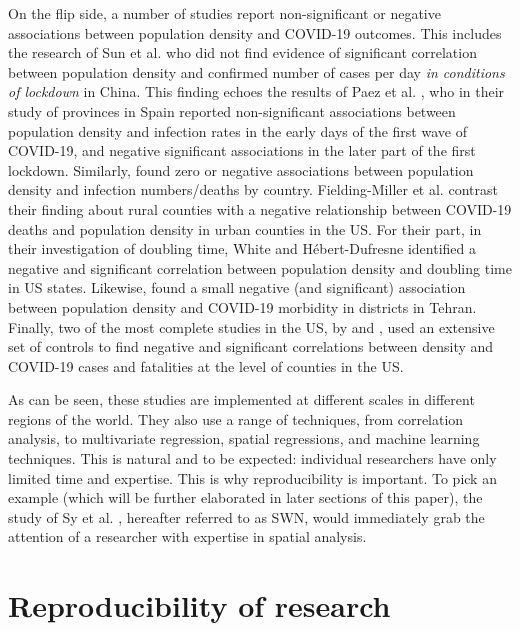 \documentclass[preprint, 3p,
authoryear]{elsarticle} %
\begin{document}
On the flip side, a number of studies report non-significant or negative
associations between population density and COVID-19 outcomes. This
includes the research of Sun et al. \citeyearpar{Sun2020impacts} who did
not find evidence of significant correlation between population density
and confirmed number of cases per day \emph{in conditions of lockdown}
in China. This finding echoes the results of Paez et al.
\citeyearpar{Paez2020spatio}, who in their study of provinces in Spain
reported non-significant associations between population density and
infection rates in the early days of the first wave of COVID-19, and
negative significant associations in the later part of the first
lockdown. Similarly, \citet{Skorka2020macroecology} found zero or
negative associations between population density and infection
numbers/deaths by country. Fielding-Miller et al.
\citeyearpar{Fielding2020social} contrast their finding about rural
counties with a negative relationship between COVID-19 deaths and
population density in urban counties in the US. For their part, in their
investigation of doubling time, White and Hébert-Dufresne
\citeyearpar{White2020state} identified a negative and significant
correlation between population density and doubling time in US states.
Likewise, \citet{Khavarian2021high} found a small negative (and
significant) association between population density and COVID-19
morbidity in districts in Tehran. Finally, two of the most complete
studies in the US, by \citet{Hamidi2020longitudinal} and
\citet{Hamidi2020density}, used an extensive set of controls to find
negative and significant correlations between density and COVID-19 cases
and fatalities at the level of counties in the US.

As can be seen, these studies are implemented at different scales in
different regions of the world. They also use a range of techniques,
from correlation analysis, to multivariate regression, spatial
regressions, and machine learning techniques. This is natural and to be
expected: individual researchers have only limited time and expertise.
This is why reproducibility is important. To pick an example (which will
be further elaborated in later sections of this paper), the study of Sy
et al. \citeyearpar{Sy2021population}, hereafter referred to as SWN,
would immediately grab the attention of a researcher with expertise in
spatial analysis.

\hypertarget{reproducibility-of-research}{%
\section{Reproducibility of
research}\label{reproducibility-of-research}}
\end{document}
